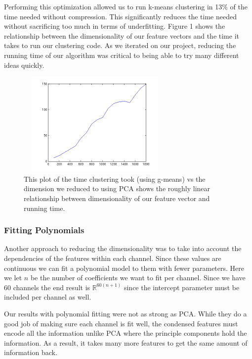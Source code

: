 \documentclass[conference]{IEEEtran}
\begin{document}
Performing this optimization allowed us to run k-means clustering in 13\%
of the time needed without compression. This significantly reduces the time
needed without sacrificing too much in terms of underfitting. Figure 1
shows the relationship between the dimensionality of our
feature vectors and the time it takes to run our clustering code. As we
iterated on our project, reducing the running time of our algorithm was
critical to being able to try many different ideas quickly.

\begin{figure}
\centering
\includegraphics[width=3in,height=2in]{../poster/images/dim_vs_runningtime.png} 
\caption{This plot of the time clustering took (using g-means) vs the
  dimension we reduced to using PCA shows the roughly linear relationship 
between dimensionality of our feature vector and running
time.}
\end{figure}

\subsubsection{Fitting Polynomials}

Another approach to reducing the dimensionality was to take
into account the dependencies of the features within each
channel. Since these values are continuous we can fit a
polynomial model to them with fewer parameters. Here we let $n$
be the number of coefficients we want to fit per channel. Since
we have 60 channels the end result is $\mathbb{R}^{60(n+1)}$
since the intercept parameter must be included per channel as well.

Our results with polynomial fitting were not as strong as
PCA. While they do a good job of making sure each channel is
fit well, the condensed features must encode all the
information unlike PCA where the principle components hold the
information. As a result, it takes many more features to get
the same amount of information back.
\end{document}
